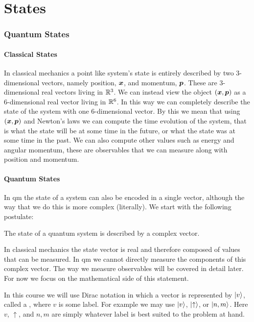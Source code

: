 \part{States}
    \section{Quantum States}
    \subsection{Classical States}
    In classical mechanics a point like system's state is entirely described by two 3-dimensional vectors, namely position, \(\bm{x}\), and momentum, \(\bm{p}\).
    These are 3-dimensional real vectors living in \(\mathbb{R}^3\).
    We can instead view the object \((\bm{x}, \bm{p})\) as a 6-dimensional real vector living in \(\mathbb{R}^6\).
    In this way we can completely describe the state of the system with one 6-dimensional vector.
    By this we mean that using \((\bm{x}, \bm{p})\) and Newton's laws we can compute the time evolution of the system, that is what the state will be at some time in the future, or what the state was at some time in the past.
    We can also compute other values such as energy and angular momentum, these are observables that we can measure along with position and momentum.
    
    \subsection{Quantum States}
    In \acrfull{qm} the state of a system can also be encoded in a single vector, although the way that we do this is more complex (literally).
    We start with the following postulate:
    \begin{postulate}\label{pos:quantum state is complex vector}
        The state of a quantum system is described by a complex vector.
    \end{postulate}
    In classical mechanics the state vector is real and therefore composed of values that can be measured.
    In \acrshort{qm} we cannot directly measure the components of this complex vector.
    The way we measure observables will be covered in detail later.
    For now we focus on the mathematical side of this statement.
    
    In this course we will use Dirac notation in which a vector is represented by \(\vert {v} \rangle\), called a , where \(v\) is some label.
    For example we may use \(\vert {v} \rangle\), \(\vert {\uparrow} \rangle\), or \(\vert {n, m} \rangle\).
    Here \(v\), \(\uparrow\), and \(n, m\) are simply whatever label is best suited to the problem at hand.
    
